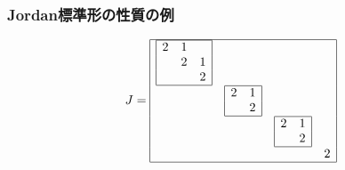 \subsubsection{Jordan標準形の性質の例}
\begin{equation}
  J=
  \begin{array}{|cccc|}
    \hline
    \begin{array}{|ccc|}
      \hline
      2&1&\\
      &2&1\\
      &&2\\\hline
    \end{array}&&&\\
    &
    \begin{array}{|cc|}
      \hline
      2&1\\
      &2\\\hline
    \end{array}&&\\
    &&\begin{array}{|cc|}
      \hline
      2&1\\
      &2\\\hline
    \end{array}&\\
    &&&2\\\hline
  \end{array}
\end{equation}

